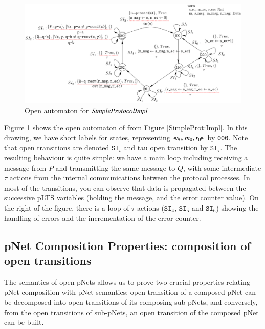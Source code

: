 \documentclass{elsarticle}
\begin{document}
 \begin{figure}[ht]
  \centerline{\includegraphics[width=\linewidth]{XFIG/SPImplOpen}}
  \caption{Open automaton for $\symb{SimpleProtocolImpl}$}  \label{SimpleProtCounter:ImplOA}
\end{figure}


    Figure \ref{SimpleProtCounter:ImplOA} shows the open automaton of   from Figure \ref{SimpleProt:Impl}. In this drawing, we have short labels for states, representing $\triangleleft{s_0,m_0,r_0}\triangleright$ by \texttt{000}. Note that open transitions are denoted $\texttt{SI}_i$ and tau open transition by  $\texttt{SI}_{\tau}$. The resulting behaviour is quite simple:  we have a main loop including receiving a message from $P$ and transmitting the same message to $Q$, with some intermediate $\tau$ actions from the internal communications between the protocol processes. In most of the transitions, you can observe that data is propagated between the successive pLTS variables (holding the message, and the error counter value). On the right of the figure, there is a loop of $\tau$ actions ($\texttt{SI}_4$, $\texttt{SI}_5$ and $\texttt{SI}_6$)  showing the handling of errors and the incrementation of the error counter.
    
    
  

\subsection{pNet Composition Properties: composition of open transitions}
The semantics of open pNets allows us to prove two crucial properties relating pNet composition with pNet semantics: open transition of a composed pNet can be decomposed into open transitions of its composing sub-pNets, and conversely, from the open transitions of sub-pNets,  an open transition of the composed pNet can be built.
\end{document}
